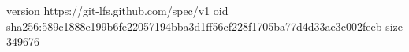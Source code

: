 version https://git-lfs.github.com/spec/v1
oid sha256:589c1888e199b6fe22057194bba3d1ff56cf228f1705ba77d4d33ae3c002feeb
size 349676
